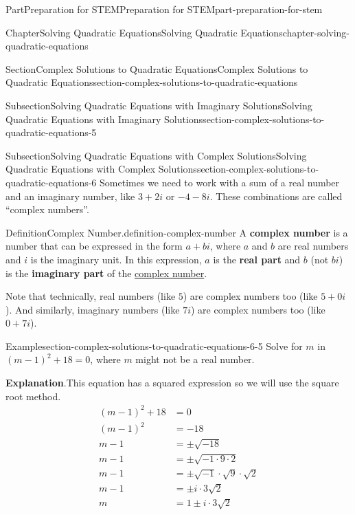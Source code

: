\documentclass[twoside,10pt,]{book}
\newcommand{\blocktitlefont}{\relax}
\newcommand{\terminology}[1]{\textbf{#1}}
\numberwithin{equation}{section}
\newcommand{\amp}{&}
\begin{document}
\begin{partptx}{Part}{Preparation for STEM}{}{Preparation for STEM}{}{}{part-preparation-for-stem}
\begin{chapterptx}{Chapter}{Solving Quadratic Equations}{}{Solving Quadratic Equations}{}{}{chapter-solving-quadratic-equations}
\begin{sectionptx}{Section}{Complex Solutions to Quadratic Equations}{}{Complex Solutions to Quadratic Equations}{}{}{section-complex-solutions-to-quadratic-equations}
\begin{subsectionptx}{Subsection}{Solving Quadratic Equations with Imaginary Solutions}{}{Solving Quadratic Equations with Imaginary Solutions}{}{}{section-complex-solutions-to-quadratic-equations-5}
\end{subsectionptx}
%
%
\typeout{************************************************}
\typeout{************************************************}
%
\begin{subsectionptx}{Subsection}{Solving Quadratic Equations with Complex Solutions}{}{Solving Quadratic Equations with Complex Solutions}{}{}{section-complex-solutions-to-quadratic-equations-6}
Sometimes we need to work with a sum of a real number and an imaginary number, like \(3+2i\) or \(-4-8i\). These combinations are called ``complex numbers''.%
\begin{definition}{Definition}{Complex Number.}{definition-complex-number}%
%
A \terminology{complex number} is a number that can be expressed in the form \(a + bi\), where \(a\) and \(b\) are real numbers and \(i\) is the imaginary unit. In this expression, \(a\) is the \terminology{real part} and \(b\) (not \(bi\)) is the \terminology{imaginary part} of the \href{https://en.wikipedia.org/wiki/Complex_number}{complex number}\footnotemark{}.%
\end{definition}
%
Note that technically, real numbers (like \(5\)) are complex numbers too (like \(5+0i\)). And similarly, imaginary numbers (like \(7i\)) are complex numbers too (like \(0+7i\)).%
\begin{example}{Example}{}{section-complex-solutions-to-quadratic-equations-6-5}%
Solve for \(m\) in \((m-1)^2+18=0\), where \(m\) might not be a real number.%
\par\smallskip%
{\makeatletter{}\makeatother\noindent\textbf{\blocktitlefont Explanation}.\hypertarget{section-complex-solutions-to-quadratic-equations-6-5-2}{}\quad{}This equation has a squared expression so we will use the square root method.%
\begin{align*}
(m-1)^2+18\amp=0\\
(m-1)^2\amp=-18\\
m-1\amp=\pm\sqrt{-18}\\
m-1\amp=\pm\sqrt{-1\cdot9\cdot2}\\
m-1\amp=\pm\sqrt{-1}\cdot\sqrt{9}\cdot\sqrt{2}\\
m-1\amp=\pm i\cdot3\sqrt{2}\\
m\amp=1\pm i\cdot3\sqrt{2}
\end{align*}
%
\begin{align*}

\end{align*}}
\end{example}
\end{subsectionptx}
\end{sectionptx}
\end{chapterptx}
\end{partptx}
\end{document}
